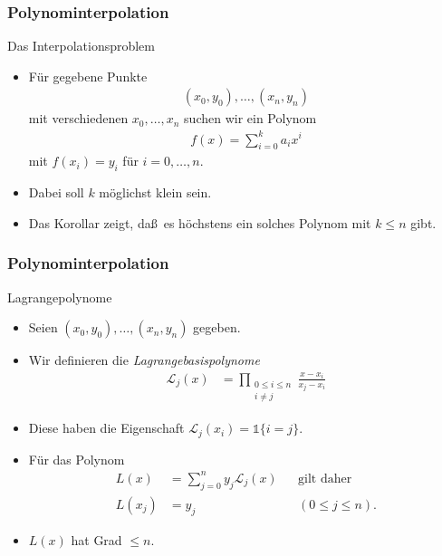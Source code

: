 \documentclass{beamer}
\renewcommand{\emph}[1]{{\textcolor{solarizedRed}{\itshape #1}}}
\newcommand\cL{\mathcal L}
\newcommand{\vecone}{\mathbb{1}}
\renewcommand{\oe}{\"o}
\newcommand{\ue}{\"u}
\newcommand{\mytitle}{Polynominterpolation}
\begin{document}
\begin{frame}\frametitle{\mytitle}
	\begin{block}{Das Interpolationsproblem}
		\begin{itemize}
			\item F\ue r gegebene Punkte
				\begin{align*}
					(x_0,y_0),\ldots,(x_n,y_n)
				\end{align*}
				mit verschiedenen $x_0,\ldots,x_n$ suchen wir ein Polynom
				\begin{align*}
					f(x)=\sum_{i=0}^ka_ix^i
				\end{align*}
				mit $f(x_i)=y_i$ f\ue r $i=0,\ldots,n$.
			\item Dabei soll $k$ m\oe glichst klein sein.
			\item Das Korollar zeigt, da\ss\ es h\oe chstens ein solches Polynom mit $k\leq n$ gibt.
		\end{itemize}
	\end{block}
\end{frame}

\begin{frame}\frametitle{\mytitle}
	\begin{block}{Lagrangepolynome}
		\begin{itemize}
			\item Seien $(x_0,y_0),\ldots,(x_n,y_n)$ gegeben.
			\item Wir definieren die \emph{Lagrangebasispolynome}
				\begin{align*}
					\cL_j(x)&=\prod_{\substack{0\leq i\leq n\\i\neq j}}\frac{x-x_i}{x_j-x_i}
				\end{align*}
			\item Diese haben die Eigenschaft $ \cL_j(x_i)=\vecone\{i=j\}.  $
			\item F\ue r das Polynom
				\begin{align*}
					L(x)&=\sum_{j=0}^ny_j\cL_j(x)&&\mbox{gilt daher}\\
					L(x_j)&=y_j&&(0\leq j\leq n).
				\end{align*}
			\item $L(x)$ hat Grad $\leq n$.
		\end{itemize}
	\end{block}
\end{frame}
\end{document}
